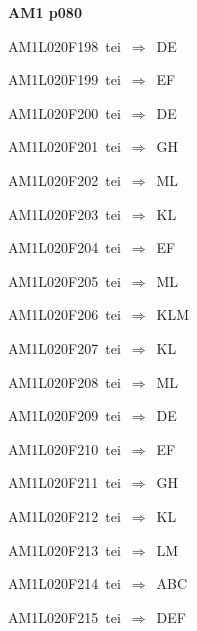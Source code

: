 \par\vfill\eject
{\bf\hfill AM1 p080\hfill\hbox{}}\par\bigskip
{\sixrm AM1L020F198\ {\sixit tei}\ }$\Rightarrow$\ DE\par\smallskip
{\sixrm AM1L020F199\ {\sixit tei}\ }$\Rightarrow$\ EF\par\smallskip
{\sixrm AM1L020F200\ {\sixit tei}\ }$\Rightarrow$\ DE\par\smallskip
{\sixrm AM1L020F201\ {\sixit tei}\ }$\Rightarrow$\ GH\par\smallskip
{\sixrm AM1L020F202\ {\sixit tei}\ }$\Rightarrow$\ ML\par\smallskip
{\sixrm AM1L020F203\ {\sixit tei}\ }$\Rightarrow$\ KL\par\smallskip
{\sixrm AM1L020F204\ {\sixit tei}\ }$\Rightarrow$\ EF\par\smallskip
{\sixrm AM1L020F205\ {\sixit tei}\ }$\Rightarrow$\ ML\par\smallskip
{\sixrm AM1L020F206\ {\sixit tei}\ }$\Rightarrow$\ KLM\par\smallskip
{\sixrm AM1L020F207\ {\sixit tei}\ }$\Rightarrow$\ KL\par\smallskip
{\sixrm AM1L020F208\ {\sixit tei}\ }$\Rightarrow$\ ML\par\smallskip
{\sixrm AM1L020F209\ {\sixit tei}\ }$\Rightarrow$\ DE\par\smallskip
{\sixrm AM1L020F210\ {\sixit tei}\ }$\Rightarrow$\ EF\par\smallskip
{\sixrm AM1L020F211\ {\sixit tei}\ }$\Rightarrow$\ GH\par\smallskip
{\sixrm AM1L020F212\ {\sixit tei}\ }$\Rightarrow$\ KL\par\smallskip
{\sixrm AM1L020F213\ {\sixit tei}\ }$\Rightarrow$\ LM\par\smallskip
{\sixrm AM1L020F214\ {\sixit tei}\ }$\Rightarrow$\ ABC\par\smallskip
{\sixrm AM1L020F215\ {\sixit tei}\ }$\Rightarrow$\ DEF\par\smallskip

